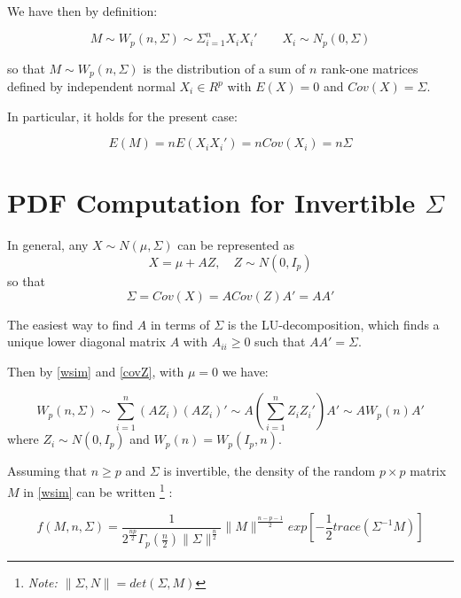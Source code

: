 \documentclass[12pt,openright,twoside,a4paper]{book}
\begin{document}
We have then by definition:

\begin{equation}
M\sim W_p(n, \Sigma)\sim\Sigma^n_{i=1}X_iX_i' \qquad X_i\sim N_p(0,\Sigma)   
\label{wsim}
\end{equation}


so that $M\sim W_p(n, \Sigma)$  is the distribution of a sum of $n$ rank-one matrices defined by independent normal $X_i \in R^p$ with $E(X)=0$ and $Cov(X)=\Sigma$.

In particular, it holds for the present case:

\begin{equation}
E(M)=nE(X_iX_i') = nCov(X_i) = n\Sigma
\end{equation}

\section{PDF Computation for Invertible $\Sigma$}

In general, any $X\sim N(\mu,\Sigma)$ can be represented as
\begin{equation}
X=\mu + AZ,\quad Z\sim N(0,I_p)
\end{equation}
so that
\begin{equation}
\Sigma= Cov(X) = A Cov(Z)A' = AA'
\label{covZ}
\end{equation}


The easiest way to find $ A$ in terms of $\Sigma$ is the LU-decomposition, which finds a unique lower diagonal matrix $A$ with $A_{ii} \geqslant 0 $ such that $AA' = \Sigma$.

Then by \ref{wsim} and \ref{covZ}, with $\mu=0$ we have:

\begin{equation}
W_p(n, \Sigma)\sim \sum_{i=1}^n(AZ_i)(AZ_i)'\sim A(\sum_{i=1}^nZ_iZ_i')A'\sim AW_p(n)A'
\end{equation}
where $Z_i\sim N(0, I_p)$ and $W_p(n)=W_p(I_p,n)$. 

Assuming that  $n\geq p$ and $\Sigma$ is invertible, the density of the random $p\times p $ matrix $M$ in \ref{wsim} can be written \footnote{\textit{Note: $\|\Sigma , N \| = det (\Sigma , M)$}} :

\begin{equation}
f(M, n, \Sigma)=\frac{1}{2^{\frac{np}{2}}\Gamma_p(\frac{n}{2})\|\Sigma\|^{\frac{n}{2}}}\|M\|^{\frac{n-p-1}{2}}exp[-\frac{1}{2}trace(\Sigma^{-1}M)]
\label{Wishart-pdf}
\end{equation} 
\end{document}
